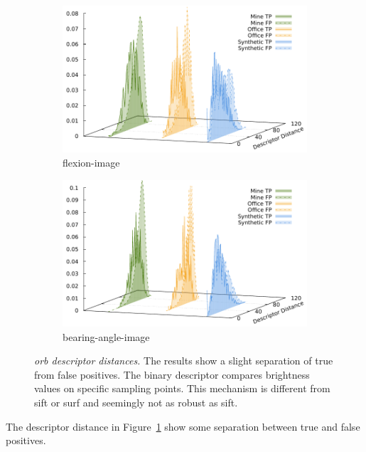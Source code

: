 \begin{figure}[H]
\begin{subfigure}[t]{0.45\linewidth}
    \includegraphics[width=\linewidth]{chapter06/results/ORB/flexion/descriptor_distances.pdf}%
    \caption{\gls{flexion-image}}
\end{subfigure}\quad
\begin{subfigure}[t]{0.45\linewidth}
    \includegraphics[width=\linewidth]{chapter06/results/ORB/bearing/descriptor_distances.pdf}%
    \caption{\gls{bearing-angle-image}}
\end{subfigure}
\caption[\acrshort{orb} descriptor distances]{\emph{\acrshort{orb} descriptor distances.} The results show a slight separation of true from false positives. The binary descriptor compares brightness values on specific sampling points. This mechanism is different from \acrshort{sift} or \acrshort{surf} and seemingly not as robust as \acrshort{sift}.}\label{fig:orb_descriptor_distances}
\end{figure}
The descriptor distance in Figure~\ref{fig:orb_descriptor_distances} show some separation between true and false positives.
